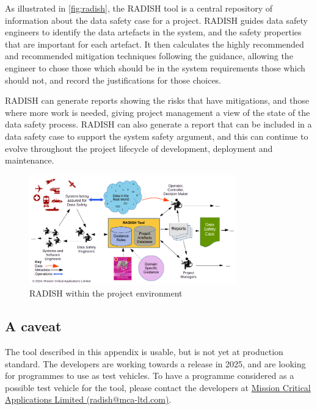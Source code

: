 As illustrated in \autoref{fig:radish}, the RADISH tool is a central repository of information about the data safety case for a project. RADISH guides data safety engineers to identify the data artefacts in the system, and the safety properties that are important for each artefact. It then calculates the highly recommended and recommended mitigation techniques following the guidance, allowing the engineer to chose those which should be in the system requirements those which should not, and record the justifications for those choices.

RADISH can generate reports showing the risks that have mitigations, and those where more work is needed, giving project management a view of the state of the data safety process. RADISH can also generate a report that can be included in a data safety case to support the system safety argument, and this can continue to evolve throughout the project lifecycle of development, deployment and maintenance.

\begin{figure}[htbp]
  \centering
  \includegraphics[angle=90,width=0.8\textwidth]{images/RADISH Tool in Project Environment - landscape.png}
  \caption{RADISH within the project environment}
  \label{fig:radish}
\end{figure}
\subsection{A caveat}
The tool described in this appendix is usable, but is not yet at production standard.
The developers are working towards a release in 2025, and are looking for programmes to use 
as test vehicles.
To have a programme considered as a possible test vehicle for the tool,
please contact the developers at
\href{mailto:radish@mca-ltd.com}{Mission Critical Applications Limited (radish@mca-ltd.com)}.

\cbend
